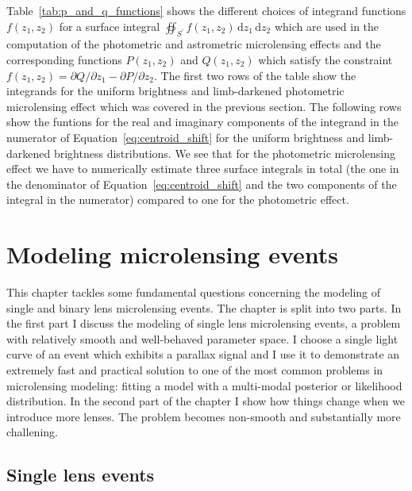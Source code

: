 \documentclass[12pt,dvipsnames]{report}
\newcommand{\ud}{\,\mathrm{d}}
\begin{document}
Table~\ref{tab:p_and_q_functions} shows the different choices of integrand functions 
$f(z_1,z_2)$ for a surface integral  $\oiint_{{S}^\prime}f(z_1,z_2)\ud z_1\ud z_2$ which 
are used in the computation of the photometric and astrometric microlensing effects and 
the corresponding functions $P(z_1,z_2)$ and $Q(z_1,z_2)$ which satisfy the constraint
$f(z_1, z_2) = \partial Q/\partial z_1 - \partial P/\partial z_2$.
The first two rows of the table show the integrands for the uniform brightness 
and limb-darkened photometric microlensing effect which was covered in the previous section.
The following rows show the funtions for the real and imaginary components of the integrand 
in the numerator of Equation~\ref{eq:centroid_shift} for the uniform brightness and 
limb-darkened brightness  distributions.
We see that for the photometric microlensing effect we have to numerically estimate three 
surface integrals in total (the one in the denominator of Equation~\ref{eq:centroid_shift} 
and the two components of the integral in the numerator) compared to one for the photometric 
effect. 




\chapter{Modeling microlensing events}
\label{ch:microlensing_modeling}
This chapter tackles some fundamental questions concerning the modeling of single 
and binary lens microlensing events. The chapter is split into two parts. In the first
part I discuss the modeling of single lens microlensing events, a problem with relatively 
smooth and well-behaved parameter space.  I choose a single light curve of an event 
which exhibits a parallax signal and I use it to demonstrate an extremely fast and 
practical solution to one of the most common problems in microlensing modeling: fitting a model with 
a multi-modal posterior or likelihood distribution. In the second part of the chapter 
I show how things change when we introduce more lenses. The problem becomes non-smooth
and substantially more challening.


\section{Single lens events}
\end{document}
